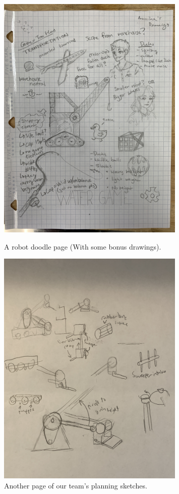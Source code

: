\begin{figure}[ht]
\centering
\begin{minipage}[b]{.50\textwidth}
  \centering
  \includegraphics[width=0.8\textwidth]{Meetings/September/09-21-21/9-19-21_Team_Image3 - Nathan Forrer.JPG}
  \caption{A robot doodle page (With some bonus drawings).}
  \label{fig:pic3}
\end{minipage}%
\hfill%
\begin{minipage}[b]{.50\textwidth}
  \centering
  \includegraphics[width=0.8\textwidth]{Meetings/September/09-21-21/9-19-21_Team_Image4 - Nathan Forrer.JPG}
  \caption{Another page of our team's planning sketches.}
  \label{fig:pic4}
\end{minipage}
\end{figure}

